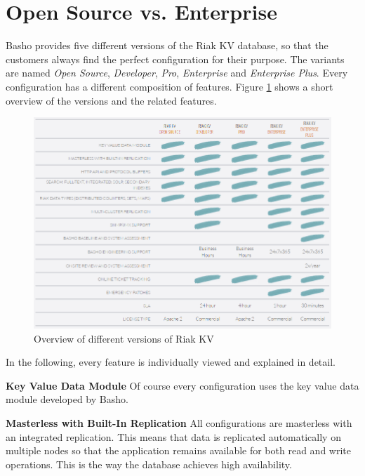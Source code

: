 \section{Open Source vs. Enterprise}

Basho provides five different versions of the Riak KV database, so that the customers always find the perfect configuration for their purpose. The variants are named \textit{Open Source}, \textit{Developer}, \textit{Pro}, \textit{Enterprise} and \textit{Enterprise Plus}. Every configuration has a different composition of features. Figure \ref{fig:overview} shows a short overview of the versions and the related features.

\begin{figure}[ht]
	\centering
	\includegraphics[width=\textwidth]{images/opensource_vs_commercial.png}
	\caption[Overview of different versions of Riak KV \protect\cite{Basho.01.04.2017}]{Overview of different versions of Riak KV \protect\cite{Basho.01.04.2017}}
	\label{fig:overview}
\end{figure}

In the following, every feature is individually viewed and explained in detail.

\newpage

\textbf{Key Value Data Module}\newline
Of course every configuration uses the key value data module developed by Basho.

\textbf{Masterless with Built-In Replication}\newline
All configurations are masterless with an integrated replication. This means that data is replicated automatically on multiple nodes so that the application remains available for both read and write operations. This is the way the database achieves high availability.

